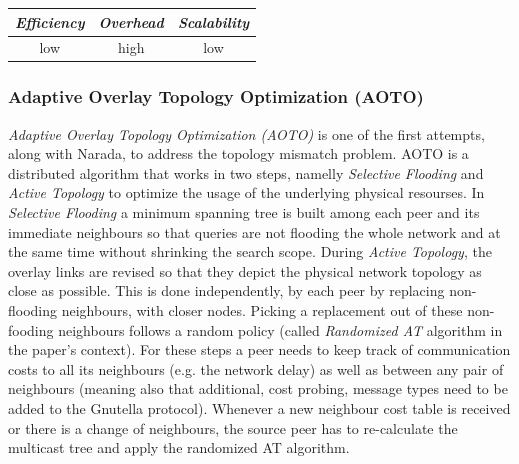 \begin{center}
\begin{tabular}{ccc}
\emph{Efficiency} & \emph{Overhead} & \emph{Scalability} \\
\hline
%
low &
high &
%
low
\end{tabular}
\end{center}

\subsubsection{Adaptive Overlay Topology Optimization (AOTO)}
\emph{Adaptive Overlay Topology Optimization (AOTO)} \cite{LZXN2003} is one
of the first attempts, along with Narada, to address the topology mismatch
problem. AOTO is a distributed algorithm that works in two steps, namelly
\emph{Selective Flooding} and \emph{Active Topology} to optimize the usage of
the underlying physical resourses. In \emph{Selective Flooding} a minimum
spanning tree is built among each peer and its immediate neighbours so that
queries are not flooding the whole network and at the same time without
shrinking the search scope. During \emph{Active Topology}, the overlay
links are revised so that they depict the physical network topology as close as
possible. This is done independently, by each peer by replacing non-flooding
neighbours, with closer nodes. Picking a replacement out of these non-fooding
neighbours follows a random policy (called \emph{Randomized AT} algorithm in the
paper's context). For these steps a peer needs to keep track of communication
costs to all its neighbours (e.g. the network delay) as well as between any
pair of neighbours (meaning also that additional, cost probing, message types
need to be added to the Gnutella protocol). Whenever a new neighbour cost table
is received or there is a change of neighbours, the source peer has to
re-calculate the multicast tree and apply the randomized AT algorithm.

